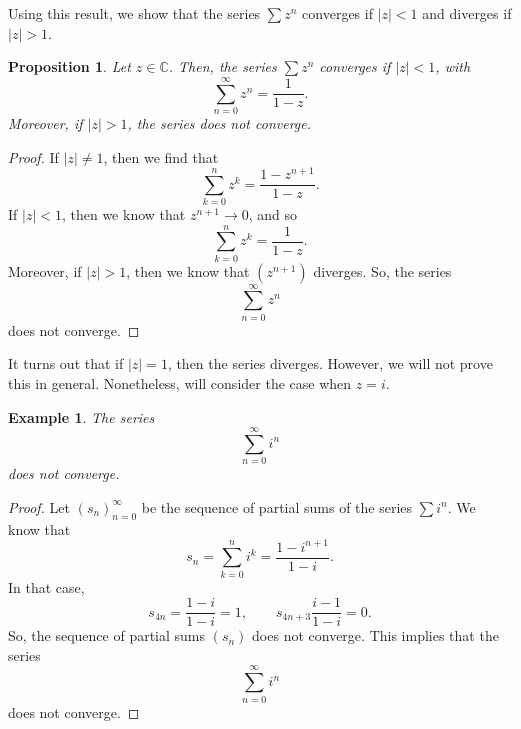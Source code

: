 \documentclass[a4paper, openany]{memoir}
\theoremstyle{definition}
\theoremstyle{plain}
\newtheorem{proposition}[definition]{Proposition}
\newtheorem{example}[definition]{Example}
\begin{document}
\noindent Using this result, we show that the series $\sum z^n$ converges if $|z| < 1$ and diverges if $|z| > 1$.
\begin{proposition}
Let $z \in \mathbb{C}$. Then, the series $\sum z^n$ converges if $|z| < 1$, with
\[\sum_{n=0}^{\infty} z^n = \frac{1}{1-z}.\]
Moreover, if $|z| > 1$, the series does not converge.
\end{proposition}
\begin{proof}
If $|z| \neq 1$, then we find that
\[\sum_{k=0}^n z^k = \frac{1 - z^{n+1}}{1 - z}.\]
If $|z| < 1$, then we know that $z^{n+1} \to 0$, and so
\[\sum_{k=0}^n z^k = \frac{1}{1 - z}.\]
Moreover, if $|z| > 1$, then we know that $(z^{n+1})$ diverges. So, the series
\[\sum_{n=0}^{\infty} z^n\]
does not converge.
\end{proof}
\noindent It turns out that if $|z| = 1$, then the series diverges. However, we will not prove this in general. Nonetheless, will consider the case when $z = i$.
\begin{example}
The series
\[\sum_{n=0}^{\infty} i^n\]
does not converge.
\end{example}
\begin{proof}
Let $(s_n)_{n=0}^{\infty}$ be the sequence of partial sums of the series $\sum i^n$. We know that
\[s_n = \sum_{k=0}^n i^k = \frac{1 - i^{n+1}}{1-i}.\]
In that case,
\[s_{4n} = \frac{1-i}{1-i} = 1, \qquad s_{4n+3} \frac{i-1}{1-i} = 0.\]
So, the sequence of partial sums $(s_n)$ does not converge. This implies that the series
\[\sum_{n=0}^{\infty} i^n\]
does not converge.
\end{proof}
\end{document}
